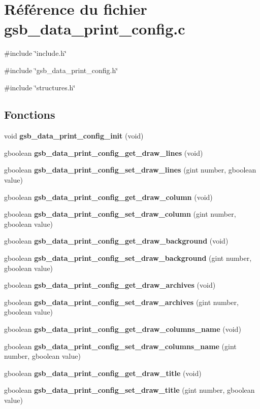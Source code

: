 \section{Référence du fichier gsb\_\-data\_\-print\_\-config.c}
\label{gsb__data__print__config_8c}
{\ttfamily \#include \char`\"{}include.h\char`\"{}}\par
{\ttfamily \#include \char`\"{}gsb\_\-data\_\-print\_\-config.h\char`\"{}}\par
{\ttfamily \#include \char`\"{}structures.h\char`\"{}}\par
\subsection*{Fonctions}
\begin{DoxyCompactItemize}
\item 
void {\bf gsb\_\-data\_\-print\_\-config\_\-init} (void)
\item 
gboolean {\bf gsb\_\-data\_\-print\_\-config\_\-get\_\-draw\_\-lines} (void)
\item 
gboolean {\bf gsb\_\-data\_\-print\_\-config\_\-set\_\-draw\_\-lines} (gint number, gboolean value)
\item 
gboolean {\bf gsb\_\-data\_\-print\_\-config\_\-get\_\-draw\_\-column} (void)
\item 
gboolean {\bf gsb\_\-data\_\-print\_\-config\_\-set\_\-draw\_\-column} (gint number, gboolean value)
\item 
gboolean {\bf gsb\_\-data\_\-print\_\-config\_\-get\_\-draw\_\-background} (void)
\item 
gboolean {\bf gsb\_\-data\_\-print\_\-config\_\-set\_\-draw\_\-background} (gint number, gboolean value)
\item 
gboolean {\bf gsb\_\-data\_\-print\_\-config\_\-get\_\-draw\_\-archives} (void)
\item 
gboolean {\bf gsb\_\-data\_\-print\_\-config\_\-set\_\-draw\_\-archives} (gint number, gboolean value)
\item 
gboolean {\bf gsb\_\-data\_\-print\_\-config\_\-get\_\-draw\_\-columns\_\-name} (void)
\item 
gboolean {\bf gsb\_\-data\_\-print\_\-config\_\-set\_\-draw\_\-columns\_\-name} (gint number, gboolean value)
\item 
gboolean {\bf gsb\_\-data\_\-print\_\-config\_\-get\_\-draw\_\-title} (void)
\item 
gboolean {\bf gsb\_\-data\_\-print\_\-config\_\-set\_\-draw\_\-title} (gint number, gboolean value)

\end{DoxyCompactItemize}
